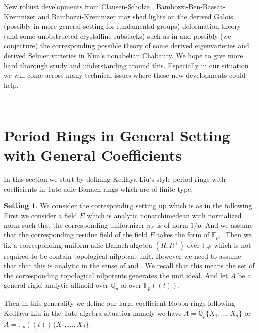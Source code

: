 \documentclass[12pt]{amsart}
\theoremstyle{definition}
\numberwithin{equation}{section}
\newtheorem{setting}[theorem]{Setting}
\begin{document}
New robust developments from Clausen-Scholze \cite{CS}, Bambozzi-Ben-Bassat-Kremnizer \cite{BBBK} and Bambozzi-Kremnizer \cite{BK1} may shed lights on the derived Galois (possibly in more general setting for fundamental groups) deformation theory (and some unobstructed crystalline substacks) such as in \cite{GV} and possibly (we conjecture) the corresponding possible theory of some derived eigenvarieties and derived Selmer varieties in Kim's nonabelian Chabauty. We hope to give more hard thorough study and understanding around this. Especially in our situation we will come across many technical issues where these new developments could help.







\


\section{Period Rings in General Setting with General Coefficients}


\noindent In this section we start by defining Kedlaya-Liu's style period rings with coefficients in Tate adic Banach rings which are of finite type. 


\begin{setting}
We consider the corresponding setting up which is as in the following. First we consider a field $E$ which is analytic nonarchimedean with normalized norm such that the corresponding uniformizer $\pi_E$ is of norm $1/p$. And we assume that the corresponding residue field of the field $E$ takes the form of $\mathbb{F}_{p^h}$. Then we fix a corresponding uniform adic Banach algebra $(R,R^+)$ over $\mathbb{F}_{p^h}$ which is not required to be contain topological nilpotent unit. However we need to assume that that this is analytic in the sense of \cite{KL1} and \cite[Definition 1.1.2]{Ked1}. We recall that this means the set of the corresponding topological nilpotents generates the unit ideal. And let $A$ be a general rigid analytic affinoid over $\mathbb{Q}_p$ or over $\mathbb{F}_p((t))$.
\end{setting}



\indent Then in this generality we define our large coefficient Robba rings following Kedlaya-Liu in the Tate algebra situation namely we have $A=\mathbb{Q}_p\{X_1,...,X_d\}$ or $A=\mathbb{F}_p((t))\{X_1,...,X_d\}$:
\end{document}
